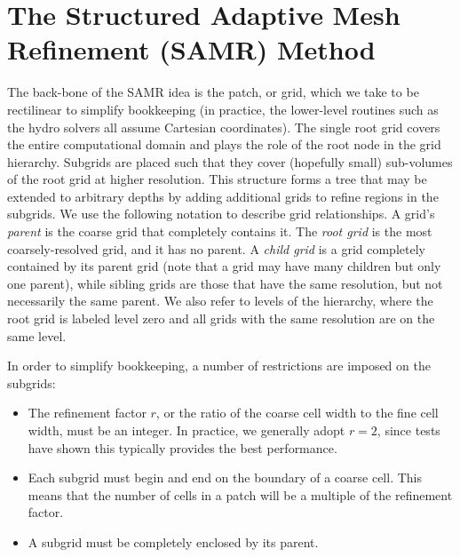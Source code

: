 \section{The Structured Adaptive Mesh Refinement (SAMR) Method}
\label{sec.amr}



The back-bone of the SAMR idea is the patch, or grid, which we take to be rectilinear to simplify bookkeeping (in practice, the lower-level routines such as the hydro solvers all assume Cartesian coordinates).  The single root grid covers the entire computational domain and plays the role of the root node in the grid hierarchy.  Subgrids are placed such that they cover (hopefully small) sub-volumes of the root grid at higher resolution.  This structure forms a tree that may be extended to arbitrary depths by adding additional grids to refine regions in the subgrids.  We use the following notation to describe grid relationships.  A grid's \textit{parent} is the coarse grid that completely contains it.  The \textit{root grid} is the most coarsely-resolved grid, and it has no parent.  A \textit{child grid} is a grid completely contained by its parent grid (note that a grid may have many children but only one parent), while sibling grids are those that have the same resolution, but not necessarily the same parent.  We also refer to levels of the hierarchy, where the root grid is labeled level zero and all grids with the same resolution are on the
same level.

In order to simplify bookkeeping, a number of restrictions are imposed on the subgrids:
\begin{itemize}
 \item The refinement factor $r$, or the ratio of the coarse cell width to the fine cell width, must be an integer.  In practice, we generally adopt $r=2$, since tests have shown this typically provides the best performance.
 \item Each subgrid must begin and end on the boundary of a coarse cell.  This means that the number of cells in a patch will be a multiple of the refinement factor.
 \item A subgrid must be completely enclosed by its parent.
\end{itemize}

